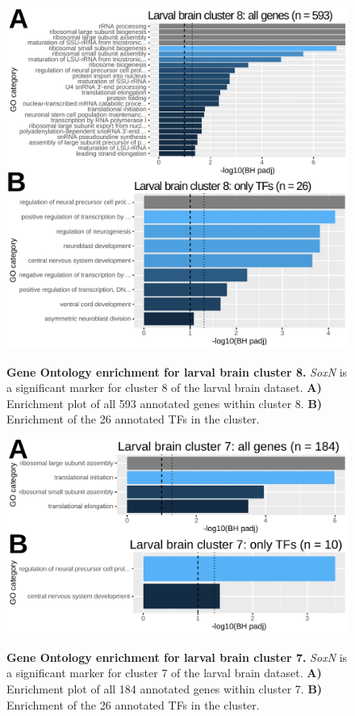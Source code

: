\documentclass[withindex,glossary]{cam-thesis}
\begin{document}
\setcounter{figure}{16-1}
\begin{figure}[htbp]
\centering
\includegraphics[width=\textwidth,keepaspectratio]{figs/Fig16 avalos cluster8.pdf}
\label{fig16}
\caption{\textbf{Gene Ontology enrichment for larval brain cluster 8.} \emph{SoxN} is a significant marker for cluster 8 of the larval brain dataset. \textbf{A)} Enrichment plot of all 593 annotated genes within cluster 8. \textbf{B)} Enrichment of the 26 annotated TFs in the cluster.}
\end{figure}

\setcounter{figure}{17-1}
\begin{figure}[htbp]
\centering
\includegraphics[width=\dimexpr\textwidth\relax,keepaspectratio]{figs/Fig17 avalos cluster7.pdf}
\label{fig17}
\caption{\textbf{Gene Ontology enrichment for larval brain cluster 7.} \emph{SoxN} is a significant marker for cluster 7 of the larval brain dataset. \textbf{A)} Enrichment plot of all 184 annotated genes within cluster 7. \textbf{B)} Enrichment of the 26 annotated TFs in the cluster.}
\end{figure}
\end{document}
